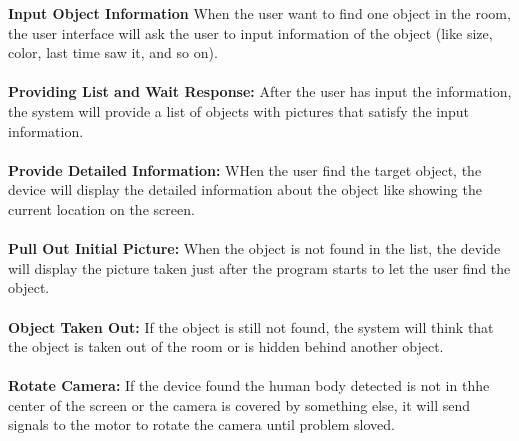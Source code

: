 \documentclass[12pt]{article}
\begin{document}
\textbf{Input Object Information} When the user want to find one object in the room, the user interface will ask the user to input information of the object (like size, color, last time saw it, and so on).\\\\
\textbf{Providing List and Wait Response:} After the user has input the information, the system will provide a list of objects with pictures that satisfy the input information.\\\\
\textbf{Provide Detailed Information:} WHen the user find the target object, the device will display the detailed information about the object like showing the current location on the screen. \\\\
\textbf{Pull Out Initial Picture:} When the object is not found in the list, the devide will display the picture taken just after the program starts to let the user find the object.\\\\
\textbf{Object Taken Out:} If the object is still not found, the system will think that the object is taken out of the room or is hidden behind another object. \\\\
\textbf{Rotate Camera:} If the device found the human body detected is not in thhe center of the screen or the camera is covered by something else, it will send signals to the motor to rotate the camera until problem sloved. 
\end{document}
